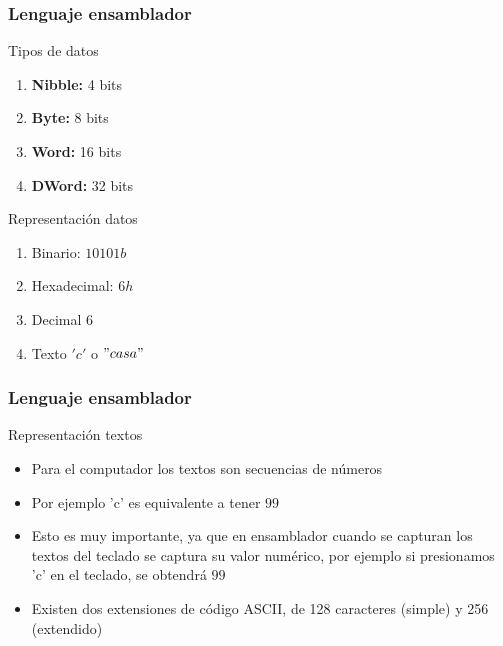 \documentclass{beamer}
\begin{document}
\begin{frame}
		\frametitle{Lenguaje ensamblador}
		\begin{block}{Tipos de datos}
		\begin{center}
			\begin{enumerate}
				\item \textbf{Nibble:} 4 bits
				\item \textbf{Byte:} 8 bits
				\item \textbf{Word:} 16 bits
				\item \textbf{DWord:} 32 bits
			\end{enumerate}
		\end{center}
	\end{block}	
	\begin{block}{Representación datos}
	\begin{enumerate}
		\item Binario: $10101b$
		\item Hexadecimal: $6h$
		\item Decimal $6$
		\item Texto $'c'$ o $"casa"$
	\end{enumerate}
	\end{block}		 		
\end{frame}

\begin{frame}
	\frametitle{Lenguaje ensamblador}
	\begin{block}{Representación textos}
		\begin{itemize}
			\item Para el computador los textos son secuencias de números
			\item Por ejemplo 'c' es equivalente a tener $99$
			\item Esto es muy importante, ya que en ensamblador cuando se capturan los textos del teclado se captura su valor numérico, por ejemplo si presionamos 'c' en el teclado, se obtendrá $99$
			\item Existen dos extensiones de código ASCII, de 128 caracteres (simple) y 256 (extendido)
		\end{itemize}			
		
	\end{block}		 		
\end{frame}
\end{document}
